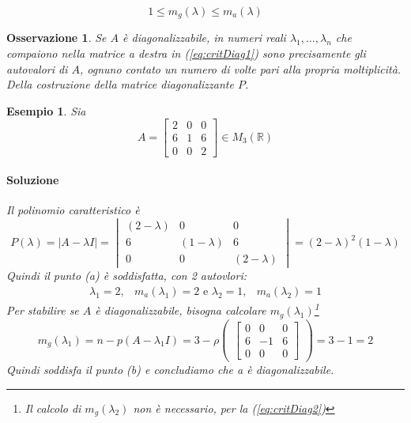 \documentclass{book}
\newtheorem{oss}{Osservazione}[section]
\newtheorem{esempio}{Esempio}[section]
\newcommand{\abs}[1]{\lvert#1\rvert}
\begin{document}
\begin{equation}
  \label{eq:critDiag2}
  1\leq m_g(\lambda)\leq m_a(\lambda)
\end{equation}
\begin{oss}
  Se $A$ è diagonalizzabile, in numeri reali $\lambda_1,\dots,\lambda_n$ che compaiono nella matrice a destra in
  (\ref{eq:critDiag1}) sono precisamente gli autovalori di $A$, ognuno contato un numero di volte pari alla
  propria moltiplicità. Della costruzione della matrice diagonalizzante $P$.  
\end{oss}
\begin{esempio}
  Sia
  \begin{equation}
    \label{eq:critDiag3}
    A=
    \begin{bmatrix}
      2 & 0 & 0\\
      6 & 1 & 6\\
      0 & 0 & 2
    \end{bmatrix} \in M_3(\mathds{R})
  \end{equation}
\paragraph{Soluzione}
Il polinomio caratteristico è
\begin{equation}
  \label{eq:critDiag4}
  P(\lambda)=\abs{A-\lambda I}=
  \begin{vmatrix}
    (2 - \lambda) & 0 & 0\\
    6 & (1-\lambda) & 6\\
    0 & 0 & (2-\lambda)
  \end{vmatrix}=(2-\lambda)^2(1-\lambda)
\end{equation}
Quindi il punto (a) è soddisfatta, con 2 autovlori:
\begin{equation}
  \label{eq:critDiag5}
  \begin{matrix}
    \lambda_{1}=2, & m_a(\lambda_1)=2 \text{ e } \lambda_2=1, & m_a(\lambda_2)=1 
  \end{matrix}
\end{equation} 
\clearpage
Per stabilire se $A$ è diagonalizzabile, bisogna calcolare $m_g(\lambda_1)$\footnote{Il calcolo di $m_g(\lambda_2)$ non
è necessario, per la (\ref{eq:critDiag2})}
\begin{equation}
  \label{eq:critDiag6}
  m_g (\lambda_1)=n-p(A-\lambda_1I)=3-\rho
  \begin{pmatrix}
    \begin{bmatrix}
      0 & 0 & 0\\
      6 & -1 & 6\\
      0 & 0 & 0
    \end{bmatrix}
  \end{pmatrix}
  =3-1=2
\end{equation}
Quindi soddisfa il punto (b) e concludiamo che a è diagonalizzabile.
\end{esempio}
\end{document}
